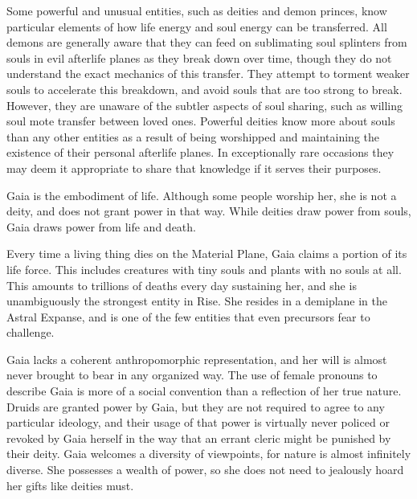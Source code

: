       Some powerful and unusual entities, such as deities and demon princes, know particular elements of how life energy and soul energy can be transferred.
      All demons are generally aware that they can feed on sublimating soul splinters from souls in evil afterlife planes as they break down over time, though they do not understand the exact mechanics of this transfer.
      They attempt to torment weaker souls to accelerate this breakdown, and avoid souls that are too strong to break.
      However, they are unaware of the subtler aspects of soul sharing, such as willing soul mote transfer between loved ones.
      Powerful deities know more about souls than any other entities as a result of being worshipped and maintaining the existence of their personal afterlife planes.
      In exceptionally rare occasions they may deem it appropriate to share that knowledge if it serves their purposes.

    Gaia is the embodiment of life.
    Although some people worship her, she is not a deity, and does not grant power in that way.
    While deities draw power from souls, Gaia draws power from life and death.

    Every time a living thing dies on the Material Plane, Gaia claims a portion of its life force.
    This includes creatures with tiny souls and plants with no souls at all.
    This amounts to trillions of deaths every day sustaining her, and she is unambiguously the strongest entity in Rise.
    She resides in a demiplane in the Astral Expanse, and is one of the few entities that even precursors fear to challenge.

    Gaia lacks a coherent anthropomorphic representation, and her will is almost never brought to bear in any organized way.
    The use of female pronouns to describe Gaia is more of a social convention than a reflection of her true nature.
    Druids are granted power by Gaia, but they are not required to agree to any particular ideology, and their usage of that power is virtually never policed or revoked by Gaia herself in the way that an errant cleric might be punished by their deity.
    Gaia welcomes a diversity of viewpoints, for nature is almost infinitely diverse.
    She possesses a wealth of power, so she does not need to jealously hoard her gifts like deities must.

